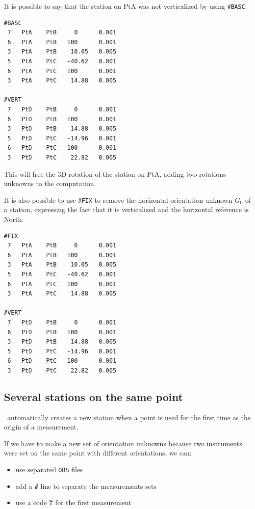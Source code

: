 It is possible to say that the station on PtA was not verticalized by using \texttt{\#BASC}:
\begin{verbatim}
#BASC
 7   PtA    PtB     0      0.001
 6   PtA    PtB   100      0.001
 3   PtA    PtB    10.05   0.005
 5   PtA    PtC   -40.62   0.001
 6   PtA    PtC   100      0.001
 3   PtA    PtC    14.88   0.005

#VERT
 7   PtD    PtB     0      0.001
 6   PtD    PtB   100      0.001
 3   PtD    PtB    14.88   0.005
 5   PtD    PtC   -14.96   0.001
 6   PtD    PtC   100      0.001
 3   PtD    PtC    22.82   0.005
\end{verbatim}

This will free the 3D rotation of the station on PtA, adding two rotations unknowns to the computation.
\newline

It is also possible to use \texttt{\#FIX} to remove the horizontal orientation unknown $G_0$ of a station, expressing the fact that it
is verticalized and the horizontal reference is North:
\begin{verbatim}
#FIX
 7   PtA    PtB     0      0.001
 6   PtA    PtB   100      0.001
 3   PtA    PtB    10.05   0.005
 5   PtA    PtC   -40.62   0.001
 6   PtA    PtC   100      0.001
 3   PtA    PtC    14.88   0.005

#VERT
 7   PtD    PtB     0      0.001
 6   PtD    PtB   100      0.001
 3   PtD    PtB    14.88   0.005
 5   PtD    PtC   -14.96   0.001
 6   PtD    PtC   100      0.001
 3   PtD    PtC    22.82   0.005
\end{verbatim}


\subsection{Several stations on the same point}

\CdPPP\ automatically creates a new station when a point is used for the first time as the origin of a measurement.

If we have to make a new set of orientation unknowns because two instruments were set on the same point with different
orientations, we can:

\begin{itemize}
   \item use separated \texttt{OBS} files
   \item add a \texttt{\#} line to separate the measurements sets
   \item use a code \textbf{7} for the first measurement
\end{itemize}


